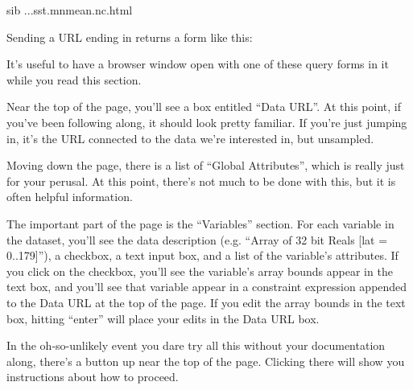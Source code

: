 \documentclass{dods-book}
\begin{document}
\begin{vcode}{sib}
...sst.mnmean.nc.html
\end{vcode}

Sending a URL ending in  returns a form like this:


It's useful to have a browser window open with one of these query forms in it
while you read this section.  

Near the top of the page, you'll see a box entitled ``Data URL''.  At
this point, if you've been following along, it should look pretty
familiar.  If you're just jumping in, it's the \opendap URL connected to
the data we're interested in, but unsampled.

Moving down the page, there is a list of ``Global Attributes'', which
is really just for your perusal.  At this point, there's not much to
be done with this, but it is often helpful information.

  The important part
of the page is the ``Variables'' section.  For each variable in the
dataset, you'll see the data description (e.g. ``Array of 32 bit Reals
[lat = 0..179]''), a checkbox, a text input box, and a list of the
variable's attributes.  If you click on the checkbox, you'll see the
variable's array bounds appear in the text box, and you'll see that
variable appear in a constraint expression appended to the Data URL at
the top of the page.  If you edit the array bounds in the text box,
hitting ``enter'' will place your edits in the Data URL box.

In the oh-so-unlikely event you dare try all this without your
documentation  along, there's a 
button up near the top of the page.  Clicking there will show you
instructions about how to proceed.

\end{document}
